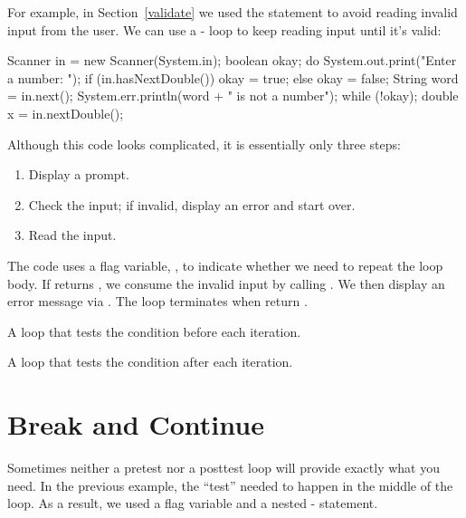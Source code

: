 
For example, in Section~\ref{validate} we used the  statement to avoid reading invalid input from the user.
We can use a - loop to keep reading input until it's valid:

\begin{code}
Scanner in = new Scanner(System.in);
boolean okay;
do {
    System.out.print("Enter a number: ");
    if (in.hasNextDouble()) {
        okay = true;
    } else {
        okay = false;
        String word = in.next();
        System.err.println(word + " is not a number");
    }
} while (!okay);
double x = in.nextDouble();
\end{code}

Although this code looks complicated, it is essentially only three steps:

\begin{enumerate}
\item Display a prompt.
\item Check the input; if invalid, display an error and start over.
\item Read the input.
\end{enumerate}


The code uses a flag variable, , to indicate whether we need to repeat the loop body.
If  returns , we consume the invalid input by calling .
We then display an error message via .
The loop terminates when  return .


\begin{description}

A loop that tests the condition before each iteration.

A loop that tests the condition after each iteration.

\end{description}


\section{Break and Continue}

Sometimes neither a pretest nor a posttest loop will provide exactly what you need.
In the previous example, the ``test'' needed to happen in the middle of the loop.
As a result, we used a flag variable and a nested - statement.

